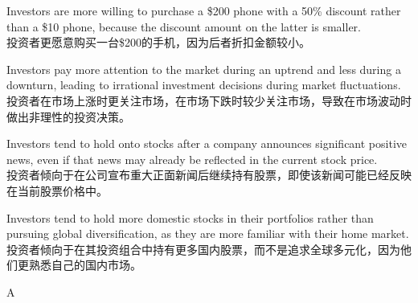 \documentclass{article}
\begin{document}
    \begin{choices}
        \item Investors are more willing to purchase a \$200 phone with a 50\% discount rather than a \$10 phone, because the discount amount on the latter is smaller.  \\
        投资者更愿意购买一台\$200的手机，因为后者折扣金额较小。
        \item Investors pay more attention to the market during an uptrend and less during a downturn, leading to irrational investment decisions during market fluctuations.  \\
        投资者在市场上涨时更关注市场，在市场下跌时较少关注市场，导致在市场波动时做出非理性的投资决策。
        \item Investors tend to hold onto stocks after a company announces significant positive news, even if that news may already be reflected in the current stock price.  \\
        投资者倾向于在公司宣布重大正面新闻后继续持有股票，即使该新闻可能已经反映在当前股票价格中。
        \item Investors tend to hold more domestic stocks in their portfolios rather than pursuing global diversification, as they are more familiar with their home market.  \\
        投资者倾向于在其投资组合中持有更多国内股票，而不是追求全球多元化，因为他们更熟悉自己的国内市场。
    \end{choices}
    
    \begin{correctanswer}
    A
    \end{correctanswer}
    
\end{document}
